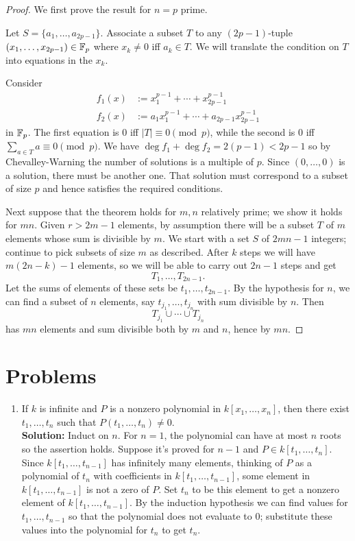 \begin{proof}
We first prove the result for $n=p$ prime.

Let $S=\{a_1,\ldots, a_{2p-1}\}$. 
Associate a subset $T$ to any $(2p-1)$-tuple $(x_1,\ldots, x_{2p-1})\in \mathbb{F}_p$ where $x_k\ne 0$ iff $a_k\in T$. We will translate the condition on $T$ into equations in the $x_k$. 

Consider
\begin{align*}
f_1(x)&:=x_1^{p-1}+\cdots +x_{2p-1}^{p-1}\\
f_2(x)&:=a_1x_1^{p-1}+\cdots +a_{2p-1}x_{2p-1}^{p-1}
\end{align*}
in $\mathbb{F}_p$. 
The first equation is 0 iff $|T|\equiv 0\pmod{p}$, while the second is 0 iff $\sum_{a\in T}a\equiv 0\pmod p$. We have $\deg f_1+\deg f_2=2(p-1)<2p-1$ so by Chevalley-Warning the number of solutions is a multiple of $p$. Since $(0,\ldots, 0)$ is a solution, there must be another one. That solution must correspond to a subset of size $p$ and hence satisfies the required conditions.

Next suppose that the theorem holds for $m,n$ relatively prime; we show it holds for $mn$. Given $r>2m-1$ elements, by assumption there will be a subset $T$ of $m$ elements whose sum is divisible by $m$. We start with a set $S$ of $2mn-1$ integers; continue to pick subsets of size $m$ as described. After $k$ steps we will have $m(2n-k)-1$ elements, so we will be able to carry out $2n-1$ steps and get
\[
T_1,\ldots, T_{2n-1}.
\]
Let the sums of elements of these sets be $t_1,\ldots, t_{2n-1}$. By the hypothesis for $n$, we can find a subset of $n$ elements, say $t_{j_1},\ldots, t_{j_n}$ with sum divisible by $n$. Then
\[
T_{j_1}\cup\cdots \cup T_{j_n}
\]
has $mn$ elements and sum divisible both by $m$ and $n$, hence by $mn$.
\end{proof}
\section*{Problems}
\begin{enumerate}
\item
If $k$ is infinite and $P$ is a nonzero polynomial in $k[x_1,\ldots,x_{n}]$, then there exist $t_1,\ldots, t_n$ such that $P(t_1,\ldots, t_n)\neq 0$.\\

\textbf{Solution: }
Induct on $n$. For $n=1$, the polynomial can have at most $n$ roots so the assertion holds. Suppose it's proved for $n-1$ and $P\in k[t_1,\ldots,t_{n}]$. Since $k[t_1,\ldots,t_{n-1}]$ has infinitely many elements, thinking of $P$ as a polynomial of $t_n$ with coefficients in $k[t_1,\ldots,t_{n-1}]$, some element in $k[t_1,\ldots,t_{n-1}]$ is not a zero of $P$. Set $t_n$ to be this element to get a nonzero element of $k[t_1,\ldots,t_{n-1}]$. By the induction hypothesis we can find values for $t_1,\ldots, t_{n-1}$ so that the polynomial does not evaluate to 0; substitute these values into the polynomial for $t_n$ to get $t_n$.
\end{enumerate}

